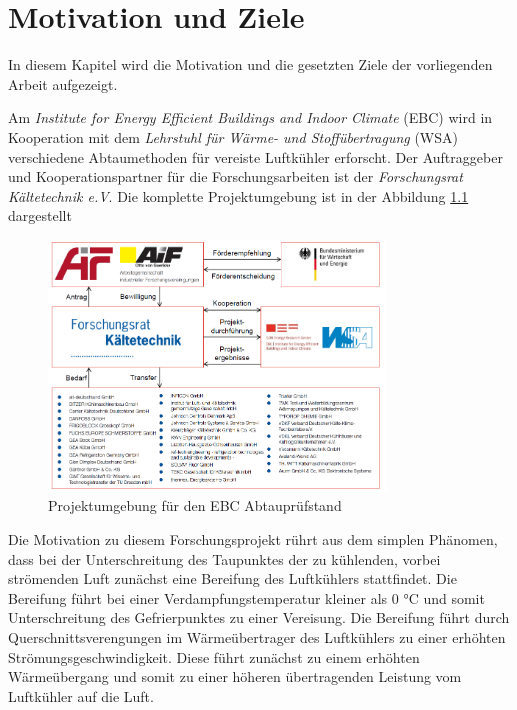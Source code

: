 \chapter{Motivation und Ziele}
\label{cha:Motivation_und_Ziele}

In diesem Kapitel wird die Motivation und die gesetzten Ziele der vorliegenden  Arbeit aufgezeigt.

Am \textit{Institute for Energy Efficient Buildings and Indoor Climate }(EBC) wird in Kooperation mit dem \textit{Lehrstuhl für Wärme- und Stoffübertragung }(WSA) verschiedene Abtaumethoden für vereiste Luftkühler erforscht. Der Auftraggeber und Kooperationspartner für die Forschungsarbeiten ist der \textit{Forschungsrat Kältetechnik e.V}. Die komplette Projektumgebung ist in der Abbildung \ref{fig:Projektumgebung} dargestellt

\begin{figure}[htb]
	\centering
		\includegraphics[width=0.80\textwidth]{Pictures/Projektumgebung.png}
	\caption{Projektumgebung für den EBC Abtauprüfstand \citep{Freitag2015}}
	\label{fig:Projektumgebung}
\end{figure}

Die Motivation zu diesem Forschungsprojekt rührt aus dem simplen Phänomen, dass bei der Unterschreitung des Taupunktes der zu kühlenden, vorbei strömenden Luft zunächst eine Bereifung des Luftkühlers stattfindet. Die Bereifung führt bei einer Verdampfungstemperatur kleiner als 0 $°$C und somit Unterschreitung des Gefrierpunktes zu einer Vereisung. Die Bereifung führt durch Querschnittsverengungen im Wärmeübertrager des Luftkühlers zu einer erhöhten Strömungsgeschwindigkeit. Diese führt zunächst zu einem erhöhten Wärmeübergang und somit zu einer höheren übertragenden Leistung vom Luftkühler auf die Luft.\citep{Schydlo2010}

